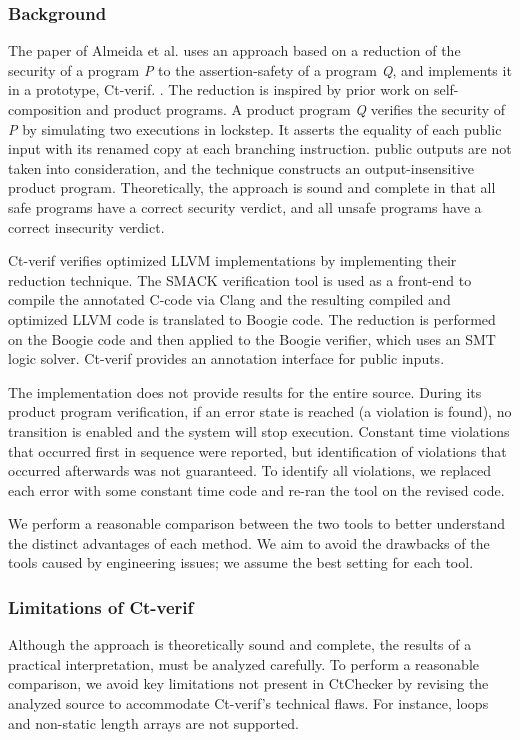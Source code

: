 \subsubsection{Background}
The paper of Almeida et al. uses an approach based on a reduction of the
security of a program \textit{P} to the assertion-safety of a program
\textit{Q}, and implements it in a prototype, Ct-verif.
\cite{almeida2016verifying}. The reduction is inspired by prior work
on self-composition and product programs.  A product program \textit{Q}
verifies the security of \textit{P} by simulating two executions in lockstep.
It asserts the equality of each public input with its renamed copy at each
branching instruction.  public outputs are not taken into consideration, and
the technique constructs an output-insensitive product program.  Theoretically,
the approach is sound and complete in that all safe programs have a correct
security verdict, and all unsafe programs have a correct insecurity verdict.

Ct-verif verifies optimized LLVM implementations by implementing their reduction
technique.  The SMACK verification tool is used as a front-end to compile the
annotated C-code via Clang and the resulting compiled and optimized LLVM code
is translated to Boogie code.  The reduction is performed on the Boogie code and
then applied to the Boogie verifier, which uses an SMT logic solver.  Ct-verif
provides an annotation interface for public inputs.

The implementation does not provide results for the entire source. During its
product program verification, if an error state is reached (a violation is
found), no transition is enabled and the system will stop execution. Constant
time violations that occurred first in sequence were reported, but
identification of violations that occurred afterwards was not guaranteed.
To identify all violations, we replaced each error with some constant time
code and re-ran the tool on the revised code.

We perform a reasonable comparison between the two tools to better understand
the distinct advantages of each method. We aim to avoid the drawbacks of the tools
caused by engineering issues; we assume the best setting for each tool.

\subsubsection{Limitations of Ct-verif}
Although the approach is theoretically sound and complete, the results of
a practical interpretation, must be analyzed carefully.  To perform
a reasonable comparison, we avoid key limitations not present in CtChecker by
revising the analyzed source to accommodate Ct-verif's technical flaws.  For
instance, loops and non-static length arrays are not supported.

